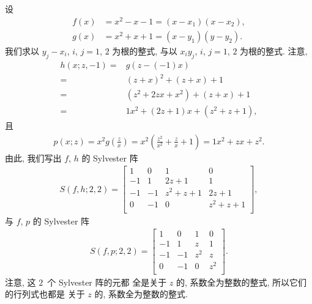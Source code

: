 \documentclass[../libro.tex]{subfiles}
\begin{document}
\begin{example}
    设
    \begin{align*}
        f(x) & = x^2 - x - 1 = (x - x_1) (x - x_2), \\
        g(x) & = x^2 + x + 1 = (x - y_1) (y - y_2).
    \end{align*}
    我们求以
    \(y_j - x_i\), \(i\), \(j = 1\), \(2\)
    为根的整式,
    与以
    \(x_i y_j\), \(i\), \(j = 1\), \(2\)
    为根的整式.
    注意,
    \begin{align*}
        h(x; z, -1)
        = {} &
        g(z - (-1) x)
        \\
        = {} &
        (z + x)^2 + (z + x) + 1
        \\
        = {} &
        (z^2 + 2 z x + x^2) + (z + x) + 1
        \\
        = {} &
        1 x^2 + (2z + 1) x + (z^2 + z + 1),
    \end{align*}
    且
    \begin{align*}
        p(x; z)
        = x^2 g\left( \frac{z}{x} \right)
        = x^2 \left(\frac{z^2}{x^2} + \frac{z}{x} + 1\right)
        = 1 x^2 + z x + z^2.
    \end{align*}
    由此, 我们写出 \(f\), \(h\) 的 Sylvester 阵
    \begin{align*}
        S(f, h; 2, 2) =
        \begin{bmatrix}
            1  & 0  & 1       & 0       \\
            -1 & 1  & 2z+1    & 1       \\
            -1 & -1 & z^2+z+1 & 2z+1    \\
            0  & -1 & 0       & z^2+z+1 \\
        \end{bmatrix},
    \end{align*}
    与 \(f\), \(p\) 的 Sylvester 阵
    \begin{align*}
        S(f, p; 2, 2) =
        \begin{bmatrix}
            1  & 0  & 1   & 0   \\
            -1 & 1  & z   & 1   \\
            -1 & -1 & z^2 & z   \\
            0  & -1 & 0   & z^2 \\
        \end{bmatrix}.
    \end{align*}
    注意, 这 \(2\)~个 Sylvester 阵的元都%
    全是关于 \(z\) 的, 系数全为整数的整式,
    所以它们的行列式也都是%
    关于 \(z\) 的, 系数全为整数的整式.


\end{example}
\end{document}
